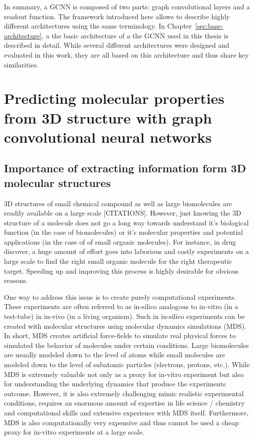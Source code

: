 In summary, a GCNN is composed of two parts: graph convolutional layers and a readout function. The framework introduced here allows to describe highly different architectures using the same terminology. In Chapter~\ref{sec:base-architecture}, a the basic architecture of a the GCNN used in this thesis is described in detail. While several different architectures were designed and evaluated in this work, they are all based on this architecture and thus share key similarities.


\section{Predicting molecular properties from 3D structure with graph convolutional neural networks}

\subsection{Importance of extracting information form 3D molecular structures}

3D structures of small chemical compound as well as large biomolecules are readily available on a large scale [CITATIONS]. However, just knowing the 3D structure of a molecule does not go a long way towards understand it's biological function (in the case of biomolecules) or it's molecular properties and potential applications (in the case of of small organic molecules). For instance, in drug discover, a huge amount of effort goes into laborious and costly experiments on a large scale to find the right small organic molecule for the right therapeutic target. Speeding up and improving this process is highly desirable for obvious reasons.

One way to address this issue is to create purely computational experiments. These experiments are often referred to as in-silico analogous to in-vitro (in a test-tube) in in-vivo (in a living organism). Such in in-silico experiments can be created with molecular structures using molecular dynamics simulations (MDS). In short, MDS creates artificial force-fields to simulate real physical forces to simulated the behavior of molecules under certain conditions. Large biomolecules are usually modeled down to the level of atoms while small molecules are modeled down to the level of subatomic particles (electrons, protons, etc.). While MDS is extremely valuable not only as a proxy for in-vitro experiment but also for understanding the underlying dynamics that produce the experiments outcome. However, it is also extremely challenging mimic realistic experimental conditions, requires an enormous amount of expertise in life science / chemistry and computational skills and extensive experience with MDS itself. Furthermore, MDS is also computationally very expensive and thus cannot be used a cheap proxy for in-vitro experiments at a large scale.

